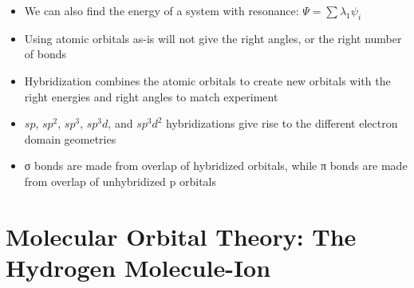 \documentclass[12pt, openany, letterpaper]{memoir}
\begin{document}
\begin{itemize}
	\item We can also find the energy of a system with resonance: $\Psi = \displaystyle\sum\lambda_1\psi_i$
	\item Using atomic orbitals as-is will not give the right angles, or the right number of bonds
	\item Hybridization combines the atomic orbitals to create new orbitals with the right energies and right angles to match experiment
	\item $sp$, $sp^2$, $sp^3$, $sp^3d$, and $sp^3d^2$ hybridizations give rise to the different electron domain geometries
	\item σ bonds are made from overlap of hybridized orbitals, while π bonds are made from overlap of unhybridized p orbitals
\end{itemize}
\section{Molecular Orbital Theory: The Hydrogen Molecule-Ion}
\end{document}
